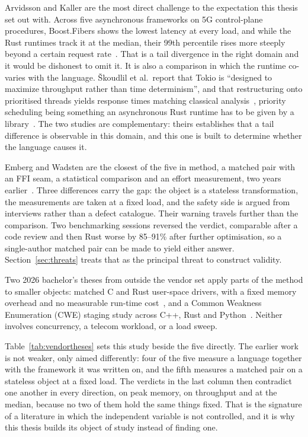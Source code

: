 Arvidsson and Kaller are the most direct challenge to the expectation this thesis set out with.
Across five asynchronous frameworks on 5G control-plane procedures, Boost.Fibers shows the lowest
latency at every load, and while the Rust runtimes track it at the median, their 99th percentile
rises more steeply beyond a certain request rate~\cite{arvidsson2025async}. That is a tail
divergence in the right domain and it would be dishonest to omit it. It is also a comparison in
which the runtime co-varies with the language. \v{S}koudlil et al.\ report that Tokio is
``designed to maximize throughput rather than time determinism'', and that restructuring onto
prioritised threads yields response times matching classical
analysis~\cite{skoudlil2025asyncrust}, priority scheduling being something an asynchronous Rust
runtime has to be given by a library~\cite{zhuang2026flowprioritize}. The two studies are
complementary: theirs establishes that a tail difference is observable in this domain, and this
one is built to determine whether the language causes it.

Emberg and Wadsten are the closest of the five in method, a matched pair with an FFI seam, a
statistical comparison and an effort measurement, two years earlier~\cite{emberg2023asn1}. Three
differences carry the gap: the object is a stateless transformation, the measurements are taken at
a fixed load, and the safety side is argued from interviews rather than a defect catalogue. Their
warning travels further than the comparison. Two benchmarking sessions reversed the verdict,
comparable after a code review and then Rust worse by 85--91\% after further optimisation, so a
single-author matched pair can be made to yield either answer. Section~\ref{sec:threats} treats
that as the principal threat to construct validity.

Two 2026 bachelor's theses from outside the vendor set apply parts of the method to smaller
objects: matched C and Rust user-space drivers, with a fixed memory overhead and no measurable
run-time cost~\cite{sundvisson2026drivers}, and a Common Weakness Enumeration (CWE) staging
study across C++, Rust and Python~\cite{andersson2026stdmemsafety}. Neither involves concurrency,
a telecom workload, or a load sweep.

Table~\ref{tab:vendortheses} sets this study beside the five directly. The earlier work is not
weaker, only aimed differently: four of the five measure a language together with the framework it
was written on, and the fifth measures a matched pair on a stateless object at a fixed load. The
verdicts in the last column then contradict one another in every direction, on peak memory, on
throughput and at the median, because no two of them hold the same things fixed. That is the
signature of a literature in which the independent variable is not controlled, and it is why this
thesis builds its object of study instead of finding one.


